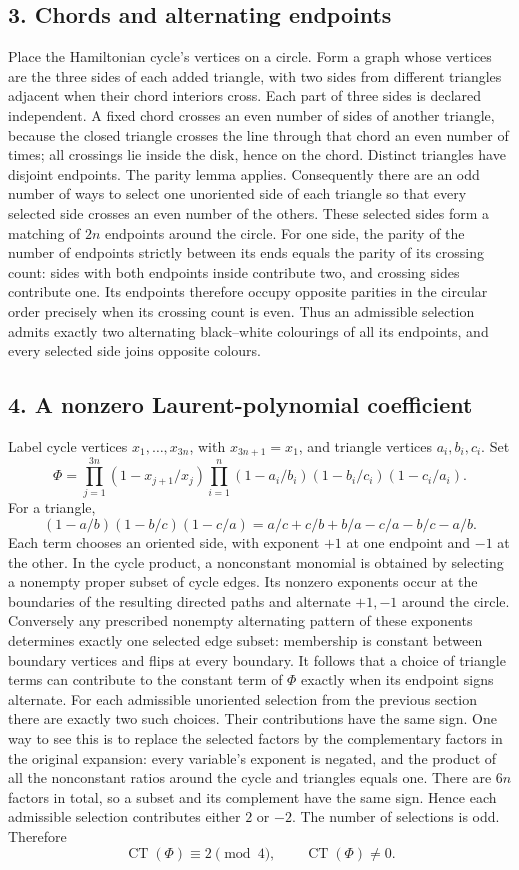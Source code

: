 \subsection*{3. Chords and alternating endpoints}
Place the Hamiltonian cycle's vertices on a circle. Form a graph whose vertices are the three sides of each added triangle, with two sides from different triangles adjacent when their chord interiors cross. Each part of three sides is declared independent. A fixed chord crosses an even number of sides of another triangle, because the closed triangle crosses the line through that chord an even number of times; all crossings lie inside the disk, hence on the chord. Distinct triangles have disjoint endpoints. The parity lemma applies.
Consequently there are an odd number of ways to select one unoriented side of each triangle so that every selected side crosses an even number of the others. These selected sides form a matching of $2n$ endpoints around the circle. For one side, the parity of the number of endpoints strictly between its ends equals the parity of its crossing count: sides with both endpoints inside contribute two, and crossing sides contribute one. Its endpoints therefore occupy opposite parities in the circular order precisely when its crossing count is even. Thus an admissible selection admits exactly two alternating black--white colourings of all its endpoints, and every selected side joins opposite colours.
\subsection*{4. A nonzero Laurent-polynomial coefficient}
Label cycle vertices $x_1,\ldots,x_{3n}$, with $x_{3n+1}=x_1$, and triangle vertices $a_i,b_i,c_i$. Set
\[
 \Phi=\prod_{j=1}^{3n}(1-x_{j+1}/x_j)
 \prod_{i=1}^n(1-a_i/b_i)(1-b_i/c_i)(1-c_i/a_i).
\]
For a triangle,
\[
 (1-a/b)(1-b/c)(1-c/a)
 =a/c+c/b+b/a-c/a-b/c-a/b.                             \tag{1}
\]
Each term chooses an oriented side, with exponent $+1$ at one endpoint and $-1$ at the other. In the cycle product, a nonconstant monomial is obtained by selecting a nonempty proper subset of cycle edges. Its nonzero exponents occur at the boundaries of the resulting directed paths and alternate $+1,-1$ around the circle. Conversely any prescribed nonempty alternating pattern of these exponents determines exactly one selected edge subset: membership is constant between boundary vertices and flips at every boundary.
It follows that a choice of triangle terms can contribute to the constant term of $\Phi$ exactly when its endpoint signs alternate. For each admissible unoriented selection from the previous section there are exactly two such choices. Their contributions have the same sign. One way to see this is to replace the selected factors by the complementary factors in the original expansion: every variable's exponent is negated, and the product of all the nonconstant ratios around the cycle and triangles equals one. There are $6n$ factors in total, so a subset and its complement have the same sign. Hence each admissible selection contributes either $2$ or $-2$.
The number of selections is odd. Therefore
\[
 \operatorname{CT}(\Phi)\equiv2\pmod4,\qquad
 \operatorname{CT}(\Phi)\ne0.                            \tag{2}
\]
